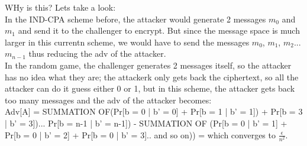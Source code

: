\documentclass[10pt]{article}
\begin{document}
\indent WHy is this? Lets take a look:\\
\indent In the IND-CPA scheme before, the attacker would generate 2 messages $m_{0}$ and $m_{1}$ and send it to the challenger to encrypt. But since the message space is much larger in this currentn scheme, we would have to send the messages $m_{0}$, $m_{1}$, $m_{2}$... $m_{n-1}$ thus reducing the adv of the attacker.\\
\indent In the random game, the challenger generates 2 messages itself, so the attacker has no idea what they are; the attackerk only gets back the ciphertext, so all the attacker can do it guess either 0 or 1, but in this scheme, the attacker gets back too many messages and the adv of the attacker becomes:\\

\indent Adv[A] = SUMMATION OF{(Pr[b = 0 | b' = 0] + Pr[b = 1 | b' = 1]) + Pr[b = 3 | b' = 3])... Pr[b = n-1 | b' = n-1])} -  SUMMATION OF (Pr[b = 0 | b' = 1] + Pr[b = 0 | b' = 2] + Pr[b = 0 | b' = 3].. and so on)) = which converges to $\frac{\epsilon}{n^{2}}$.\\
\end{document}
